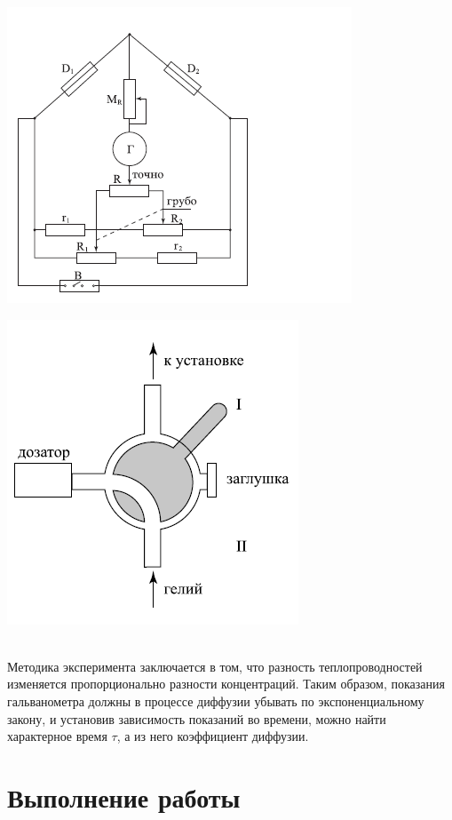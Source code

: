 \documentclass[12pt]{article}
\begin{document}
		\begin{minipage}{0.45\textwidth}
			\includegraphics{2}
		\end{minipage}
		\hspace{1cm}
		\begin{minipage}{0.45\textwidth}
			\includegraphics{3}
		\end{minipage}
		\\
		Методика эксперимента заключается в том, что разность теплопроводностей изменяется пропорционально разности концентраций. Таким образом, показания гальванометра должны в процессе диффузии убывать по экспоненциальному закону, и установив зависимость показаний во времени, можно найти характерное время $\tau$, а из него коэффициент диффузии.	
		
		\section*{Выполнение работы}
		
\end{document}
